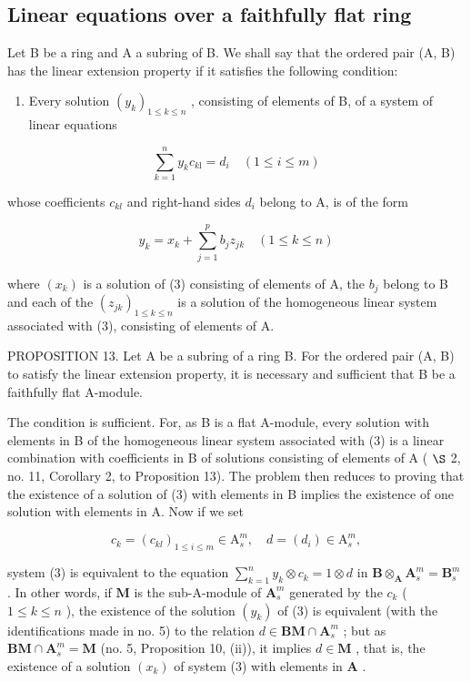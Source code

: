 \subsection{Linear equations over a faithfully flat ring}

Let B be a ring and A a subring of B. We shall say that the ordered pair (A, B) has the linear extension property if it satisfies the following condition:

\begin{enumerate}
\def\labelenumi{(\Alph{enumi})}
\setcounter{enumi}{4}
\tightlist
\item
  Every solution \((y_{k})_{1\leqslant k\leqslant n}\) , consisting of elements of B, of a system of linear equations
\end{enumerate}

\[
\sum_ {k = 1} ^ {n} y _ {k} c _ {k \mathrm{l}} = d _ {i} \quad (1 \leqslant i \leqslant m)\tag{3}
\]

whose coefficients \(c_{kl}\) and right-hand sides \(d_{i}\) belong to A, is of the form

\[
y _ {k} = x _ {k} + \sum_ {j = 1} ^ {p} b _ {j} z _ {j k} \quad (1 \leqslant k \leqslant n)\tag{4}
\]

where \((x_{k})\) is a solution of (3) consisting of elements of A, the \(b_{j}\) belong to B and each of the \((z_{jk})_{1\leq k\leq n}\) is a solution of the homogeneous linear system associated with (3), consisting of elements of A.

PROPOSITION 13. Let A be a subring of a ring B. For the ordered pair (A, B) to satisfy the linear extension property, it is necessary and sufficient that B be a faithfully flat A-module.

The condition is sufficient. For, as B is a flat A-module, every solution with elements in B of the homogeneous linear system associated with (3) is a linear combination with coefficients in B of solutions consisting of elements of A ( \(\S\) 2, no. 11, Corollary 2, to Proposition 13). The problem then reduces to proving that the existence of a solution of (3) with elements in B implies the existence of one solution with elements in A. Now if we set

\[
c _ {k} = \left(c _ {k l}\right) _ {1 \leqslant i \leqslant m} \in \mathrm{A} _ {s} ^ {m}, \quad d = (d _ {i}) \in \mathrm{A} _ {s} ^ {m},
\]

system (3) is equivalent to the equation \(\sum_{k=1}^{n} y_k \otimes c_k = 1 \otimes d\) in \(\mathbf{B} \otimes_{\mathbf{A}} \mathbf{A}_s^m = \mathbf{B}_s^m\) . In other words, if \(\mathbf{M}\) is the sub-A-module of \(\mathbf{A}_s^m\) generated by the \(c_k\) ( \(1 \leqslant k \leqslant n\) ), the existence of the solution \((y_k)\) of (3) is equivalent (with the identifications made in no. 5) to the relation \(d \in \mathbf{BM} \cap \mathbf{A}_s^m\) ; but as \(\mathbf{BM} \cap \mathbf{A}_s^m = \mathbf{M}\) (no. 5, Proposition 10, (ii)), it implies \(d \in \mathbf{M}\) , that is, the existence of a solution \((x_k)\) of system (3) with elements in \(\mathbf{A}\) .

